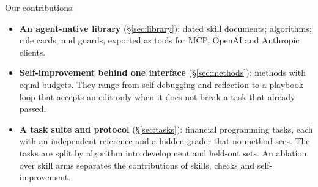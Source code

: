 Our contributions:
\begin{itemize}
\item \textbf{An agent-native library} (\S\ref{sec:library}): \NSkills{} dated skill
documents; \NAlgorithms{} algorithms; \NCards{} rule cards; and \NGuards{} guards, exported
as \NTools{} tools for MCP, OpenAI and Anthropic clients.
\item \textbf{Self-improvement behind one interface} (\S\ref{sec:methods}): \NMethods{}
methods with equal budgets. They range from self-debugging and reflection to a playbook
loop that accepts an edit only when it does not break a task that already passed.
\item \textbf{A task suite and protocol} (\S\ref{sec:tasks}): \NTasks{} financial programming
tasks, each with an independent reference and a hidden grader that no method sees. The
tasks are split by algorithm into development and held-out sets. An ablation over
\NArms{} skill arms separates the contributions of skills, checks and self-improvement.
\end{itemize}
